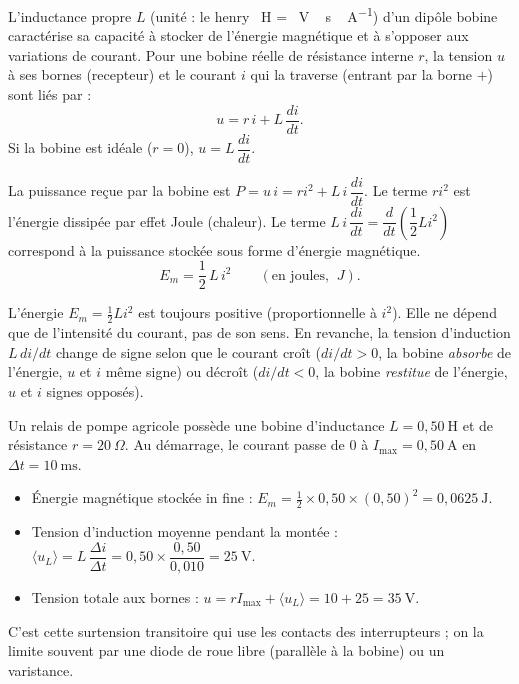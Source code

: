 \documentclass[11pt]{article}
\newcommand{\cle}[1]{{\popxbold\color{popdark}#1}}
\begin{document}
\begin{definition}
L'\cle{inductance propre} $L$ (unité : le \cle{henry} \SI{}{H} = \SI{}{V\,s\,A^{-1}}) d'un dipôle bobine caractérise sa capacité à stocker de l'énergie magnétique et à s'opposer aux variations de courant. Pour une bobine réelle de résistance interne $r$, la tension $u$ à ses bornes (recepteur) et le courant $i$ qui la traverse (entrant par la borne $+$) sont liés par :
\[
u = r\,i + L\,\frac{di}{dt}.
\]
Si la bobine est idéale ($r = 0$), $u = L\,\dfrac{di}{dt}$.
\end{definition}

\begin{propriete}
La puissance reçue par la bobine est $P = u\,i = r i^2 + L\,i\,\dfrac{di}{dt}$. Le terme $r i^2$ est l'énergie dissipée par effet Joule (chaleur). Le terme $L\,i\,\dfrac{di}{dt} = \dfrac{d}{dt}\left(\dfrac{1}{2}L i^2\right)$ correspond à la puissance stockée sous forme d'énergie magnétique.
\[
E_m = \frac{1}{2}\,L\,i^2 \qquad (\text{en joules, } \SI{}{J}).
\]
\begin{attention}
L'énergie $E_m = \frac{1}{2}Li^2$ est toujours positive (proportionnelle à $i^2$). Elle ne dépend que de l'intensité du courant, pas de son sens. En revanche, la tension d'induction $L\,di/dt$ change de signe selon que le courant croît ($di/dt > 0$, la bobine \emph{absorbe} de l'énergie, $u$ et $i$ même signe) ou décroît ($di/dt < 0$, la bobine \emph{restitue} de l'énergie, $u$ et $i$ signes opposés).
\end{attention}
\end{propriete}

\begin{exemplebox}
Un relais de pompe agricole possède une bobine d'inductance $L = 0,50~\mathrm{H}$ et de résistance $r = 20~\Omega$. Au démarrage, le courant passe de $0$ à $I_{\max} = 0,50~\mathrm{A}$ en $\Delta t = 10~\mathrm{ms}$.
\begin{itemize}
\item Énergie magnétique stockée in fine : $E_m = \frac{1}{2}\times 0,50 \times (0,50)^2 = 0,0625~\mathrm{J}$.
\item Tension d'induction moyenne pendant la montée : $\langle u_L \rangle = L\,\dfrac{\Delta i}{\Delta t} = 0,50 \times \dfrac{0,50}{0,010} = 25~\mathrm{V}$.
\item Tension totale aux bornes : $u = r I_{\max} + \langle u_L \rangle = 10 + 25 = 35~\mathrm{V}$.
\end{itemize}
C'est cette surtension transitoire qui use les contacts des interrupteurs ; on la limite souvent par une diode de roue libre (parallèle à la bobine) ou un varistance.
\end{exemplebox}
\end{document}
